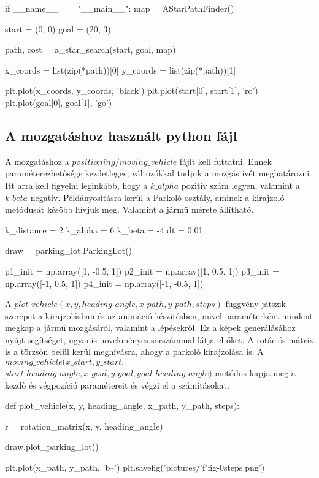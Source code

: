\begin{python}
if __name__ == "__main__":
    map = AStarPathFinder()

    start = (0, 0)
    goal = (20, 3)

    path, cost = a_star_search(start, goal, map)
    
    x_coords = list(zip(*path))[0]
    y_coords = list(zip(*path))[1]
    
    plt.plot(x_coords, y_coords, 'black')
    plt.plot(start[0], start[1], 'ro')
    plt.plot(goal[0], goal[1], 'go')
\end{python}


\subsection{A mozgatáshoz használt python fájl}

A mozgatáshoz a $ positioning/moving\_vehicle $ fájlt kell futtatni. Ennek paraméterezhetősége kezdetleges, változókkal tudjuk a mozgás ívét meghatározni. Itt arra kell figyelni leginkább, hogy a $ k\_alpha $ pozitív szám legyen, valamint a $ k\_beta $ negatív. Példányosításra kerül a Parkoló osztály, aminek a kirajzoló metódusát később hívjuk meg. Valamint a jármű mérete állítható. 

\begin{python}
k_distance = 2
k_alpha = 6
k_beta = -4
dt = 0.01

draw = parking_lot.ParkingLot()

p1_init = np.array([1, -0.5, 1])
p2_init = np.array([1, 0.5, 1])
p3_init = np.array([-1, 0.5, 1])
p4_init = np.array([-1, -0.5, 1])
\end{python}

A $ plot\_vehicle(x, y, heading\_angle, x\_path, y\_path, steps) $ függvény játszik szerepet a kirajzolásban és az animáció készítésben,  mivel paraméterként mindent megkap a jármű mozgásáról, valamint a lépésekről. Ez a képek generálásához nyújt segítséget, ugyanis növekményes sorszámmal látja el őket. A rotációs mátrix is a törzsön belül kerül meghívásra, ahogy a parkoló kirajzolása is. A $ moving\_vehicle(x\_start, y\_start,$ \\ $start\_heading\_angle, x\_goal, y\_goal, goal\_heading\_angle) $ metódus kapja meg a kezdő és végpozíció paramétereit és végzi el a számításokat. 

\begin{python}
def plot_vehicle(x, y, heading_angle, x_path, y_path, steps):

	r = rotation_matrix(x, y, heading_angle)
	
	draw.plot_parking_lot()
	
	plt.plot(x_path, y_path, 'b--')
    	plt.savefig('pictures/'f'fig-0{steps}.png')
\end{python}

